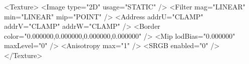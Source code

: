 <Texture>
    <Image type="2D" usage="STATIC" />
    <Filter mag="LINEAR" min="LINEAR" mip="POINT" />
    <Address addrU="CLAMP" addrV="CLAMP" addrW="CLAMP" />
    <Border color="0.000000,0.000000,0.000000,0.000000" />
    <Mip lodBias="0.000000" maxLevel="0" />
    <Anisotropy max="1" />
    <SRGB enabled="0" />
</Texture>

